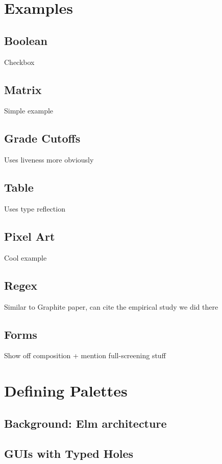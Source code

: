 \documentclass[sigplan,review,anonymous]{acmart}\settopmatter{printfolios=true}
\theoremstyle{slplain}
\numberwithin{thm}{section}
\begin{document}
\section{Examples}
\subsection{Boolean}
Checkbox

\subsection{Matrix}
Simple example

\subsection{Grade Cutoffs}
Uses liveness more obviously

\subsection{Table}
Uses type reflection

\subsection{Pixel Art}
Cool example

\subsection{Regex}
Similar to Graphite paper, can cite the empirical study we did there

\subsection{Forms}
Show off composition + mention full-screening stuff

\section{Defining Palettes}
\subsection{Background: Elm architecture}

\subsection{GUIs with Typed Holes}
\end{document}
